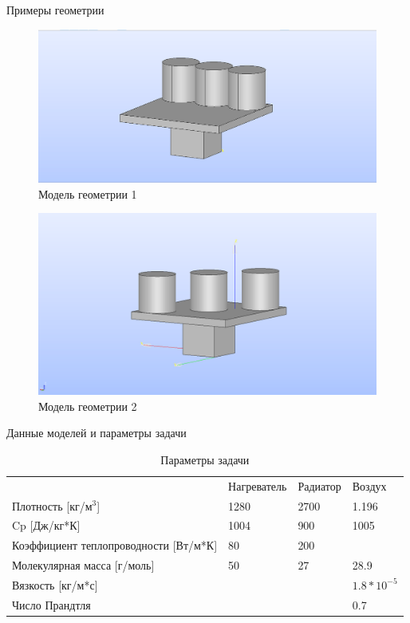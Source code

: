 \documentclass{beamer}
\begin{document}
\begin{frame}{Примеры геометрии}
	\begin{figure}[h]
		\begin{center}
			\includegraphics[width=0.5\linewidth]{1.1.png}
			\caption{Модель геометрии 1}
		\end{center}
	\end{figure}
	\begin{figure}[h]
		\begin{center}
			\includegraphics[width=0.5\linewidth]{1.2.png}
			\caption{Модель геометрии 2}
		\end{center}
	\end{figure}
\end{frame}

\begin{frame}{Данные моделей и параметры задачи}
	\begin{table}[h]
		\begin{tabular}{|l|l|l|l|}
			\hline
			                                          & Нагреватель & Радиатор & Воздух        \\
			Плотность {[}кг/$м^3${]}                  & 1280        & 2700     & 1.196         \\
			\hline
			Cp   {[}Дж/кг*К{]}                        & 1004        & 900      & 1005          \\
			\hline
			Коэффициент теплопроводности {[}Вт/м*К{]} & 80          & 200      &               \\
			\hline
			Молекулярная масса {[}г/моль{]}           & 50          & 27       & 28.9          \\
			\hline
			Вязкость {[}кг/м*с{]}                     &             &          & $1.8*10^{-5}$ \\
			\hline
			Число Прандтля                            &             &          & 0.7           \\
			\hline
		\end{tabular}
		\caption{Параметры задачи} %
	\end{table}
\end{frame}
\end{document}
